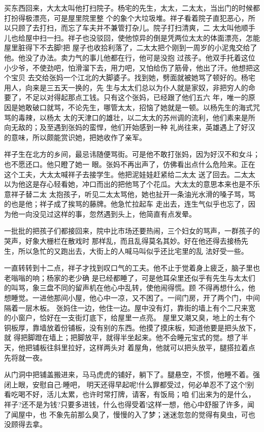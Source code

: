 \documentclass[11pt,a4paper,onecolumn]{article}
\begin{document}
买东西回来，大太太叫他打扫院子。杨宅的先生，太太，二太太，当出门的时候都打扮得极漂亮，可是屋里院里整
个的象个大垃圾堆。祥子看着院子直犯恶心，所以只顾了去打扫，而忘了车夫并不兼管打杂儿。院子打扫清爽，二
太太叫他顺手儿也给屋中扫一扫。祥子也没驳回，使他惊异的倒是凭两位太太的体面漂亮，怎能屋里脏得下不去脚!把
屋子也收拾利落了，二太太把个刚到一周岁的小泥鬼交给了他。他没了办法。卖力气的事儿他都在行，他可是没抱
过孩子。他双手托着这位小少爷，不使劲吧，怕滑溜下去，用力吧，又怕给伤了筋骨，他出了汗。他想把这个宝贝
去交给张妈\myrule 一个江北的大脚婆子。找到她，劈面就被她骂了顿好的。杨宅用人，向来是三五天一换的，先
生与太太们总以为仆人就是家奴，非把穷人的命要了，不足以对得起那点工钱。只有这个张妈，已经跟了他们五六
年，唯一的原因是她敢破口就骂，不论先生，哪管太太，招恼了她就是一顿。以杨先生的海式咒骂的毒辣，以杨太
太的天津口的雄壮，以二太太的苏州调的流利，他们素来是所向无敌的；及至遇到张妈的蛮悍，他们开始感到一种
礼尚往来，英雄遇上了好汉的意味，所以颇能赏识她，把她收作了亲军。

祥子生在北方的乡间，最忌讳随便骂街。可是他不敢打张妈，因为好汉不和女斗；也不愿还口。他只瞪了她一
眼。张妈不再出声了，仿佛看出点什么危险来。正在这个工夫，大太太喊祥子去接学生。他把泥娃娃赶紧给二太太
送了回去。二太太以为他这是存心轻看她，冲口而出的把他骂了个花瓜。大太太的意思本来也是不乐意祥子替二太
太抱孩子，听见二太太骂他，她也扯开一条油光水滑的嗓子骂，骂的也是他；祥子成了挨骂的藤牌。他急忙拉起车
走出去，连生气似乎也忘了，因为他一向没见过这样的事，忽然遇到头上，他简直有点发晕。

一批批的把孩子们都接回来，院中比市场还要热闹，三个妇女的骂声，一群孩子的哭声，好象大栅栏在散戏时
那样乱，而且乱得莫名其妙。好在他还得去接杨先生，所以急忙的又跑出去，大街上的人喊马叫似乎还比宅里的乱
法好受一些。

一直转转到十二点，祥子才找到叹口气的工夫。他不止于觉着身上疲乏，脑子里也老嗡嗡的响；杨家的老少确
是已经都睡了，可是他耳朵里还似乎有先生与太太们的叫骂，象三盘不同的留声机在他心中乱转，使他闹得慌。顾
不得再想什么，他想睡觉。一进他那间小屋，他心中一凉，又不困了。一间门房，开了两个门，中间隔着一层木板。
张妈住一边，他住一边。屋中没有灯，靠街的墙上有个二尺来宽的小窗户，恰好在一支街灯底下，给屋里一点亮。
屋里又潮又臭，地上的土有个铜板厚，靠墙放着份铺板，没有别的东西。他摸了摸床板，知道他要是把头放下，就
得把脚蹬在墙上；把脚放平，就得半坐起来。他不会睡元宝式的觉。想了半天，他把铺板往斜里拉好，这样两头对
着屋角，他就可以把头放平，腿搭拉着点先将就一夜。

从门洞中把铺盖搬进来，马马虎虎的铺好，躺下了。腿悬空，不惯，他睡不着。强闭上眼，安慰自己:睡吧，
明天还得早起呢!什么罪都受过，何必单忍不了这个!别看吃喝不好，活儿太累，也许时常打牌，请客，有饭局；咱
们出来为的是什么，祥子?还不是为钱?只要多进钱，什么也得受着!这样一想，他心中舒服了许多，闻了闻屋中，也
不象先前那么臭了，慢慢的入了梦；迷迷忽忽的觉得有臭虫，可也没顾得去拿。
\end{document}
